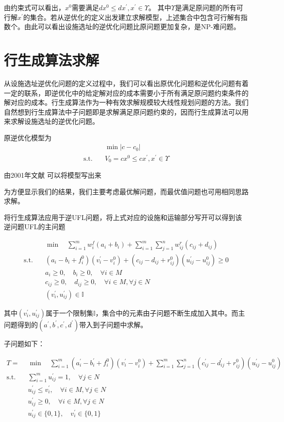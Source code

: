 \documentclass[UTF8]{article}
\begin{document}
由约束式可以看出，$x^0$需要满足$dx^0 \leq dx^{'}, x^{'} \in \Upsilon$。 其中$\Upsilon$是满足原问题的所有可行解$x^{'}$的集合。若从逆优化的定义出发建立求解模型，上述集合中包含可行解有指数个。由此可以看出设施选址的逆优化问题比原问题更加复杂，是NP-难问题。

\section{行生成算法求解}
从设施选址逆优化问题的定义过程中，我们可以看出原优化问题和逆优化问题有着一定的联系，即逆优化中的给定解对应的成本需要小于所有满足原问题约束条件的解对应的成本。行生成算法作为一种有效求解规模较大线性规划问题的方法。我们自然想到行生成算法中子问题即是求解满足原问题约束的，因而行生成算法可以用来求解设施选址的逆优化问题。

原逆优化模型为
\begin{align*}
&\min |c-c_0|  \\
\text{s.t.}\quad & V_0 = cx^0 \leq cx^{'}, x^{'} \in \Upsilon
\end{align*}

由2001年文献 可以将模型写出来

为方便显示我们的结果，我们主要考虑最优解问题，而最优值问题也可用相同思路求解。

将行生成算法应用于逆UFL问题，将上式对应的设施和运输部分写开可以得到该逆问题UFL的主问题

\begin{align*}
&\min \quad \sum_{i=1}^m w_i^f(a_i+b_i)+\sum_{i=1}^m\sum_{j=1}^n w_{ij}^r(c_{ij}+d_{ij})\\
\text{s.t.}\quad & (a_i-b_i+f_i^0)(v_i^{'}-v_i^{0}) + (c_{ij}-d_{ij}+r_{ij}^0)(u_{ij}^{'}-u_{ij}^{0})  \geq 0 \\
& a_i \geq 0 ,\quad b_i \geq 0,\quad \forall i \in M \\
& c_{ij} \geq 0, \quad d_{ij} \geq 0, \quad \forall i \in M, \forall j \in N\\
& (v_i^{'},u_{ij}^{'}) \in \mathbb{I}
\end{align*}

其中$(v_i^{'},u_{ij}^{'})$属于一个限制集$\mathbb{I}$，集合中的元素由子问题不断生成加入其中。而主问题得到的$(a^{'},b^{'},c^{'},d^{'})$带入到子问题中求解。

子问题如下：

\begin{align*}
T = &\min \quad \sum_{i=1}^m(a_i^{'}-b_i^{'}+f_i^0)(v_i^{'}-v_i^{0})+\sum_{i=1}^m\sum_{j=1}^n(c_{ij}^{'}-d_{ij}^{'}+r_{ij}^0)(u_{ij}^{'}-u_{ij}^{0}) \\
\text{s.t.}\quad & \sum_{i=1}^m u_{ij}^{'} =1, \quad \forall j\in N \\
& u_{ij}^{'} \leq v_{i}^{'}, \quad \forall i \in M, \forall j \in N \\
& u_{ij}^{'} \geq 0, \quad \forall i \in M, \forall j \in N \\
&u_{ij}^{'} \in \{0,1\} ,\quad v_{i}^{'} \in \{0,1\}
\end{align*}
\end{document}

